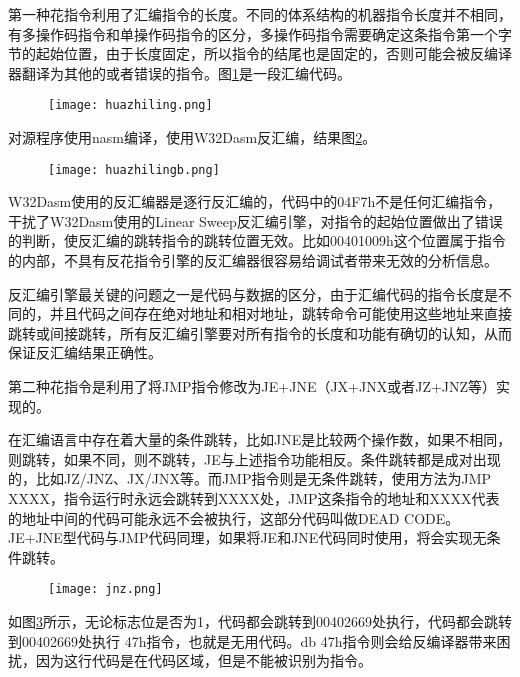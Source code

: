 第一种花指令利用了汇编指令的长度。不同的体系结构的机器指令长度并不相同，有多操作码指令和单操作码指令的区分，多操作码指令需要确定这条指令第一个字节的起始位置，由于长度固定，所以指令的结尾也是固定的，否则可能会被反编译器翻译为其他的或者错误的指令。图\ref{huazhilinga}是一段汇编代码。

\begin{figure}[htbp]
	\centering
	\texttt{[image: huazhiling.png]}
	\label{huazhilinga}
\end{figure}


对源程序使用nasm编译，使用W32Dasm反汇编，结果图\ref{huazhliingb}。

\begin{figure}[htbp]
	\centering
	\centering
	\texttt{[image: huazhilingb.png]}
	\label{huazhliingb}
\end{figure}

W32Dasm使用的反汇编器是逐行反汇编的，代码中的04F7h不是任何汇编指令，干扰了W32Dasm使用的Linear Sweep反汇编引擎，对指令的起始位置做出了错误的判断，使反汇编的跳转指令的跳转位置无效。比如00401009h这个位置属于指令的内部，不具有反花指令引擎的反汇编器很容易给调试者带来无效的分析信息。

反汇编引擎最关键的问题之一是代码与数据的区分，由于汇编代码的指令长度是不同的，并且代码之间存在绝对地址和相对地址，跳转命令可能使用这些地址来直接跳转或间接跳转，所有反汇编引擎要对所有指令的长度和功能有确切的认知，从而保证反汇编结果正确性。

第二种花指令是利用了将JMP指令修改为JE+JNE（JX+JNX或者JZ+JNZ等）实现的。

在汇编语言中存在着大量的条件跳转，比如JNE是比较两个操作数，如果不相同，则跳转，如果不同，则不跳转，JE与上述指令功能相反。条件跳转都是成对出现的，比如JZ/JNZ、JX/JNX等。而JMP指令则是无条件跳转，使用方法为JMP XXXX，指令运行时永远会跳转到XXXX处，JMP这条指令的地址和XXXX代表的地址中间的代码可能永远不会被执行，这部分代码叫做DEAD CODE。JE+JNE型代码与JMP代码同理，如果将JE和JNE代码同时使用，将会实现无条件跳转。

\begin{figure}[htbp]
	\centering
	\texttt{[image: jnz.png]}
	\label{jnz}
\end{figure}


如图\ref{jnz}所示，无论标志位是否为1，代码都会跳转到00402669处执行，代码都会跳转到00402669处执行 47h指令，也就是无用代码。db 47h指令则会给反编译器带来困扰，因为这行代码是在代码区域，但是不能被识别为指令。

